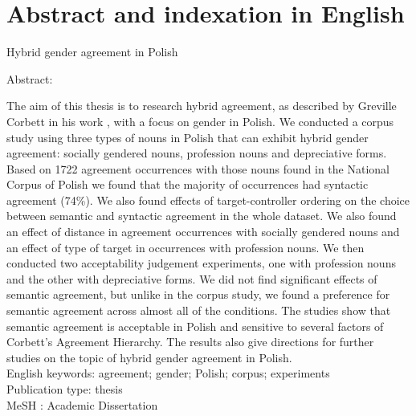 \chapter*{Abstract and indexation in English}\label{chap:abstract}

Hybrid gender agreement in Polish

Abstract: 

The aim of this thesis is to research hybrid agreement, as described by Greville Corbett in his work \citep{corbett_agreement_2023, corbett_agreement_1979}, with a focus on gender in Polish. We conducted a corpus study using three types of nouns in Polish that can exhibit hybrid gender agreement: socially gendered nouns, profession nouns and depreciative forms. Based on 1722 agreement occurrences with those nouns found in the National Corpus of Polish we found that the majority of occurrences had syntactic agreement (74\%). We also found effects of target-controller ordering on the choice between semantic and syntactic agreement in the whole dataset. We also found an effect of distance in agreement occurrences with socially gendered nouns and an effect of type of target in occurrences with profession nouns. We then conducted two acceptability judgement experiments, one with profession nouns and the other with depreciative forms. We did not find significant effects of semantic agreement, but unlike in the corpus study, we found a preference for semantic agreement across almost all of the conditions. The studies show that semantic agreement is acceptable in Polish and sensitive to several factors of Corbett's Agreement Hierarchy. The results also give directions for further studies on the topic of hybrid gender agreement in Polish.
\\


English keywords: agreement; gender; Polish; corpus; experiments
\\


Publication type: thesis
\\

MeSH : Academic Dissertation 




